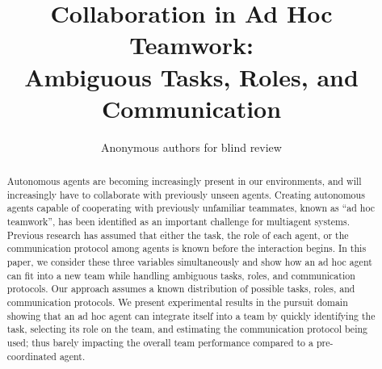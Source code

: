 \documentclass{article}
\title{Collaboration in Ad Hoc Teamwork: \\
Ambiguous Tasks, Roles, and Communication}
\author{Anonymous authors for blind review}
\begin{document}
\maketitle

\begin{abstract}
Autonomous agents are becoming increasingly present in our environments, and will increasingly have to collaborate with previously unseen agents. Creating autonomous agents capable of cooperating with previously unfamiliar teammates, known as ``ad hoc teamwork'', has been identified as an important challenge for multiagent systems. Previous research has assumed that either the task, the role of each agent, or the communication protocol among agents is known before the interaction begins. In this paper, we consider these three variables simultaneously and show how an ad hoc agent can fit into a new team while handling ambiguous tasks, roles, and communication protocols. Our approach assumes a known distribution of possible tasks, roles, and communication protocols. We present experimental results in the pursuit domain showing that an ad hoc agent can integrate itself into a team by quickly identifying the task, selecting its role on the team, and estimating the communication protocol being used; thus barely impacting the overall team performance compared to a pre-coordinated agent.
\end{abstract}













%

\clearpage



\end{document}

